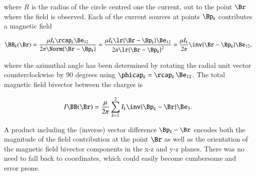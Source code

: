 where \( R \) is the radius of the circle centred one the current, out to the point \( \Br \) where the field is observed.
Each of the current sources at points \( \Bp_k \) contributes a magnetic field

\begin{dmath}\label{eqn:amperesLawMagnetostaticsExample:80}
\BB_k(\Br)
= \frac{\mu I_k \rcap_k \Be_{12} }{2 \pi \Norm{ \Br - \Bp_k} }
= \frac{\mu I_k \lr{ \Br - \Bp_k} \Be_{12} }{2 \pi \lr{ \Br - \Bp_k}^2 }
= \frac{\mu I_k}{2\pi} \inv{ \Br - \Bp_k} \Be_{12},
\end{dmath}

where the azimuthal angle has been determined by rotating the radial unit vector counterclockwise by 90 degrees using \( \phicap_k = \rcap_k\, \Be_{12} \).
The total magnetic field bivector between the charges is

\begin{equation}\label{eqn:amperesLawMagnetostaticsExample:100}
I \BB(\Br)
= \frac{\mu}{2\pi} \sum_{k = 1}^2 I_k \inv{\Bp_k - \Br } \Be_3.
\end{equation}

A product including the (inverse) vector difference \( \Bp_k - \Br \) encodes both the magnitude of the field contribution at the point \( \Br \) as well as the orientation of the magnetic field bivector components in the x-z and y-z planes.
There was no need to fall back to coordinates, which could easily become cumbersome and error prone.
